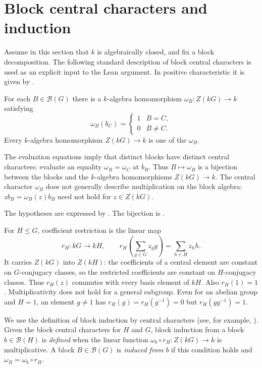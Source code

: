 \section{Block central characters and induction}
\label{lib:blocks:induction}

Assume in this section that $k$ is algebraically closed, and fix a block
decomposition. The following standard description of block central
characters is used as an explicit input to the Lean argument.
In positive characteristic it is given by
\cite[Theorem~3.11]{Navarro1998}.

\begin{hypothesis}
\label{lib:blocks:catalogue}
For each $B\in\mathcal B(G)$ there is a $k$-algebra homomorphism
$\omega_B:Z(kG)\to k$ satisfying
\[
 \omega_B(b_C)=
 \begin{cases}1& B=C,\\0& B\ne C.\end{cases}
\]
Every $k$-algebra homomorphism $Z(kG)\to k$ is one of the $\omega_B$.
\end{hypothesis}

The evaluation equations imply that distinct blocks have distinct
central characters: evaluate an equality $\omega_B=\omega_C$ at $b_B$.
Thus $B\mapsto\omega_B$ is a bijection between the blocks and the
$k$-algebra homomorphisms $Z(kG)\to k$. The central character $\omega_B$
does not generally describe multiplication on the block algebra:
$zb_B=\omega_B(z)b_B$ need not hold for $z\in Z(kG)$.
\begin{implementation}
The hypotheses are expressed by
. The bijection is
.
\end{implementation}

For $H\leq G$, coefficient restriction is the linear map
\[
 r_H:kG\longrightarrow kH,
 \qquad r_H\left(\sum_{g\in G}z_gg\right)=\sum_{h\in H}z_hh.
\]
It carries $Z(kG)$ into $Z(kH)$: the coefficients of a central
element are constant on $G$-conjugacy classes, so the restricted
coefficients are constant on $H$-conjugacy classes. Thus $r_H(z)$
commutes with every basis element of $kH$. Also $r_H(1)=1$.
Multiplicativity does not hold for a general subgroup. Even for an
abelian group and $H=1$, an element $g\ne1$ has
$r_H(g)=r_H(g^{-1})=0$ but $r_H(gg^{-1})=1$.

\begin{definition}
We use the definition of block induction by central characters
(see, for example, \cite[p.~87]{Navarro1998}). Given the block central characters for
$H$ and $G$, block induction from a block
$b\in\mathcal B(H)$ is \emph{defined} when the linear function
$\omega_b\circ r_H:Z(kG)\to k$ is multiplicative.
A block $B\in\mathcal B(G)$ is \emph{induced from} $b$ if this
condition holds and $\omega_B=\omega_b\circ r_H$.
\end{definition}

